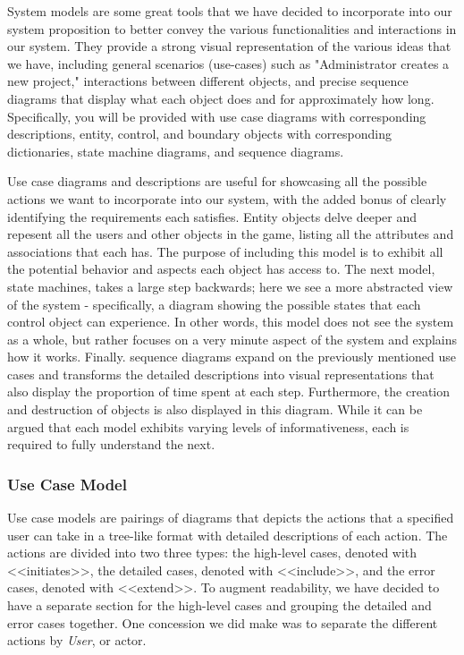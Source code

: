 \documentclass[12pt,letterpaper]{article}
\begin{document}
System models are some great tools that we have decided to incorporate into our system proposition to better convey the various functionalities and
interactions in our system. They provide a strong visual representation of the various ideas that we have, including general scenarios (use-cases) such as 
"Administrator creates a new project," interactions between different objects, and precise sequence diagrams that display what each object
does and for approximately how long. Specifically, you will be provided with use case diagrams with corresponding descriptions, entity, control, and boundary objects with corresponding  
dictionaries, state machine diagrams, and sequence diagrams. 

Use case diagrams and descriptions are useful for showcasing all the possible actions we want to incorporate into our system, with the added bonus of clearly
identifying the requirements each satisfies. Entity objects delve deeper and repesent all the users and other objects in the game, listing all the attributes and associations
that each has. The purpose of including this model is to exhibit all the potential behavior and aspects each object has access to. The next model, state machines, takes a large
step backwards; here we see a more abstracted view of the system - specifically, a diagram showing the possible states that each control object can experience. In other words, this
model does not see the system as a whole, but rather focuses on a very minute aspect of the system and explains how it works. Finally. sequence diagrams
expand on the previously mentioned use cases and transforms the detailed descriptions into visual representations that also display the proportion of time spent
at each step. Furthermore, the creation and destruction of objects is also displayed in this diagram. While it can be argued that each model exhibits varying levels
of informativeness, each is required to fully understand the next.

\subsubsection{Use Case Model}

Use case models are pairings of diagrams that depicts the actions that a specified user can take in a tree-like format with detailed descriptions of each action. The actions 
are divided into two three types: the high-level cases, denoted with <<initiates>>, the detailed cases, denoted with <<include>>, and the error cases, denoted with 
<<extend>>. To augment readability, we have decided to have a separate section for the high-level cases and grouping the detailed and error cases together. One 
concession we did make was to separate the different actions by {\it User}, or actor. 
\end{document}
